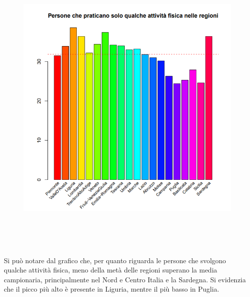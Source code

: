 \begin{figure}[!htbp]
    \centering
    \includegraphics[height=15cm]{ProgettoSAD/capitoli/images/barre_qualcheatt.png}
    \label{fig:barre_qualcheatt}
\end{figure}

Si può notare dal grafico che, per quanto riguarda le persone che svolgono qualche attività fisica, meno della metà delle regioni superano la media campionaria, principalmente nel Nord e Centro Italia e la Sardegna. Si evidenzia che il picco più alto è presente in Liguria, mentre il più basso in Puglia.

